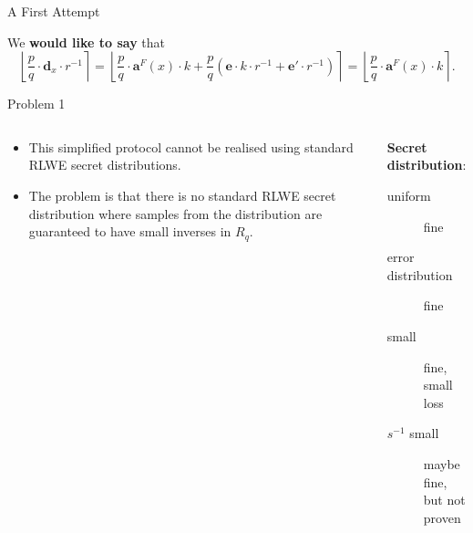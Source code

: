 \documentclass[xcolor=table,10pt,aspectratio=169]{beamer}
\begin{document}
\begin{frame}[label={sec:orgcb935fe}]{A First Attempt}
\begin{center}
\end{center}

We \textbf{would like to say} that \[\left\lfloor \frac{p}{q} \cdot \mathbf{d}_x \cdot r^{-1} \right\rceil = \left\lfloor  \frac{p}{q}\cdot \mathbf{a}^F(x) \cdot k + \frac{p}{q}\left(\mathbf{e}\cdot k\cdot r^{-1} + \mathbf{e}'\cdot  r^{-1}\right) \right\rceil = \left\lfloor \frac{p}{q} \cdot \mathbf{a}^F(x)\cdot k \right\rceil. \]
\end{frame}

\begin{frame}[label={sec:org97073f8}]{Problem 1}
\begin{columns}[t]
\begin{column}{0.5\columnwidth}
\begin{itemize}
\item This simplified protocol cannot be realised using standard RLWE secret distributions.
\item The problem is that there is no standard RLWE secret distribution where samples from the distribution are guaranteed to have \alert{small inverses} in \(R_q\).
\end{itemize}
\end{column}

\begin{column}{0.5\columnwidth}
\textbf{Secret distribution}:

\begin{description}
\item[{uniform}] fine
\item[{error distribution}] fine
\item[{small}] fine, small loss
\item[{\(s^{-1}\) small}] maybe fine, but not proven
\end{description}
\end{column}
\end{columns}
\end{frame}
\end{document}
